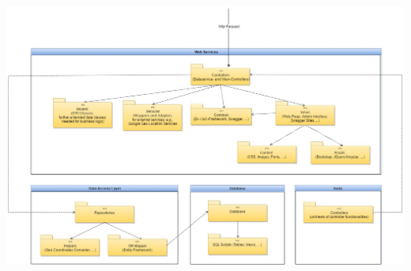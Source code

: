 \documentclass[a4paper,10pt,xetex]{article}
\begin{document}
\begin{center}
	\includegraphics[width=7.3264in,height=4.7646in]{backend_architektur1.jpg}
\end{center}

\bigskip


\bigskip
\end{document}
